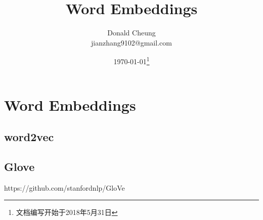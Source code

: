 \ifx\projectsnotes\undefined
    \providecommand{\notesroot}{../..}
    \providecommand{\wordembeddingroots}{.}

    \title{Word Embeddings}
    \author{Donald Cheung\\jianzhang9102@gmail.com}
    \date{\today\footnote{文档编写开始于2018年5月31日}}

    
\else
    \providecommand{\wordembeddingroots}{\projectsroot/word_embeddings}
\fi

\chapter{Word Embeddings}

\section{word2vec}

\section{Glove}
https://github.com/stanfordnlp/GloVe

\ifx\projectsnotes\undefined
    
\fi
